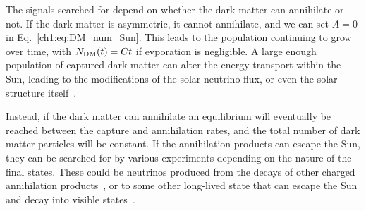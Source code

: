 The signals searched for depend on whether the dark matter can annihilate or not. If the dark matter is asymmetric, it cannot annihilate, and we can set $A = 0$ in Eq.~\ref{ch1:eq:DM_num_Sun}. This leads to the population continuing to grow over time, with $N_\mathrm{DM}(t) = Ct$ if evporation is negligible. A large enough population of captured dark matter can alter the energy transport within the Sun, leading to the modifications of the solar neutrino flux, or even the solar structure itself~\cite{Franarin:2018gfk_jun_JUNOSensitivityResonant, Cumberbatch:2010hh_LightWIMPsSun, Vincent:2013lua_apr_Thermalconductiondark,Vincent:2015gqa_aug_Generalisedformfactor}. 

Instead, if the dark matter can annihilate an equilibrium will eventually be reached between the capture and annihilation rates, and the total number of dark matter particles will be constant. If the annihilation products can escape the Sun, they can be searched for by various experiments depending on the nature of the final states.
These could be neutrinos produced from the decays of other charged annihilation products~\cite{Super-Kamiokande:2011wjy_IndirectSearchWIMPs,Super-Kamiokande:2015xms_apr_Searchneutrinosannihilation,ANTARES:2016obx_may_SearchSecludedDark,ANTARES:2016xuh_aug_LimitsDarkMatter,IceCube:2016dgk_Searchannihilatingdark}, or to some other long-lived state that can escape the Sun and decay into visible states~\cite{Batell:2009zp_SolarGammaRays,Schuster:2009au_TerrestrialSolarLimits,Bell:2011sn_Enhancedneutrinosignals,Feng:2016ijc_jun_DarkSunshineDetecting,Leane:2017vag_jun_PowerfulSolarSignatures}.


